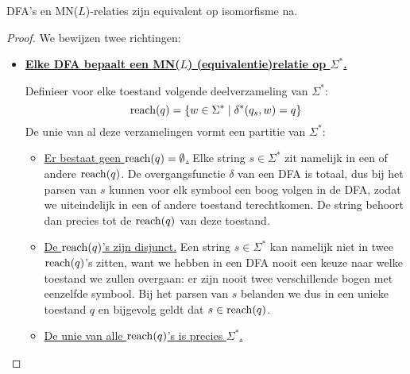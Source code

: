 \documentclass[../aanvullingen_cursus.tex]{subfiles}
\begin{document}
\begin{stelling}
	DFA's en MN(\(L\))-relaties zijn equivalent op isomorfisme na.
\end{stelling}


\begin{proof}
	We bewijzen twee richtingen:
	\begin{itemize}
		\item \underline{\textbf{Elke DFA bepaalt een MN(\(L\)) (equivalentie)relatie  op \(\Sigma^*\).}}

		Definieer voor elke toestand volgende deelverzameling van \(\Sigma^*\): \[\operatorname{reach}(q) = \{w \in \Sigma^* \mid \delta^*(q_s,w)=q\}\] De unie van al deze verzamelingen vormt een partitie van \(\Sigma^*\):
		\begin{itemize}
			\item \underline{Er bestaat geen \(\operatorname{reach}(q)=\emptyset\).} Elke string \(s \in \Sigma^*\) zit namelijk in een of andere \(\operatorname{reach}(q)\). De overgangsfunctie \(\delta\) van een DFA is totaal, dus bij het parsen van \(s\) kunnen voor elk symbool een boog volgen in de DFA, zodat we uiteindelijk in een of andere toestand terechtkomen. De string behoort dan precies tot de \(\operatorname{reach}(q)\) van deze toestand.
			\item \underline{De \(\operatorname{reach}(q)\)'s zijn disjunct.} Een string \(s \in \Sigma^*\) kan namelijk niet in twee \(\operatorname{reach}(q)\)'s zitten, want we hebben in een DFA nooit een keuze naar welke toestand we zullen overgaan: er zijn nooit twee verschillende bogen met eenzelfde symbool. Bij het parsen van \(s\) belanden we dus in een unieke toestand \(q\) en bijgevolg geldt dat \(s \in \operatorname{reach}(q)\).
			\item \underline{De unie van alle \(\operatorname{reach}(q)\)'s is precies \(\Sigma^*\).}
		\end{itemize}


\end{itemize}
\end{proof}
\end{document}
